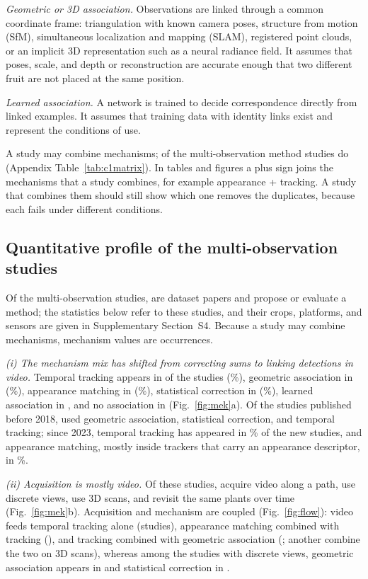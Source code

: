\textit{Geometric or 3D association.} Observations are linked through a common coordinate frame: triangulation with known camera poses, structure from motion (SfM), simultaneous localization and mapping (SLAM), registered point clouds, or an implicit 3D representation such as a neural radiance field. It assumes that poses, scale, and depth or reconstruction are accurate enough that two different fruit are not placed at the same position.

\textit{Learned association.} A network is trained to decide correspondence directly from linked examples. It assumes that training data with identity links exist and represent the conditions of use.

A study may combine mechanisms; \nCombined of the \nMethod multi-observation method studies do (Appendix Table~\ref{tab:c1matrix}). In tables and figures a plus sign joins the mechanisms that a study combines, for example appearance + tracking. A study that combines them should still show which one removes the duplicates, because each fails under different conditions.

\subsection{Quantitative profile of the multi-observation studies}\label{sec:landscape}
Of the \nMulti multi-observation studies, \nMultiData are dataset papers and \nMethod propose or evaluate a method; the statistics below refer to these \nMethod studies, and their crops, platforms, and sensors are given in Supplementary Section~S4. Because a study may combine mechanisms, mechanism values are occurrences.

\textit{(i) The mechanism mix has shifted from correcting sums to linking detections in video.} Temporal tracking appears in \nTrack of the \nMethod studies (\pTrack\%), geometric association in \nGeom (\pGeom\%), appearance matching in \nApp (\pApp\%), statistical correction in \nStat (\pStat\%), learned association in \nLearn, and no association in \nNone (Fig.~\ref{fig:mek}a). Of the \nEarly studies published before 2018, \nEarlyGeom used geometric association, \nEarlyStat statistical correction, and \nEarlyTrack temporal tracking; since 2023, temporal tracking has appeared in \pTrackRecent\% of the \nRecent new studies, and appearance matching, mostly inside trackers that carry an appearance descriptor, in \pAppRecent\%.

\textit{(ii) Acquisition is mostly video.} Of these studies, \nVideo acquire video along a path, \nDiscrete use discrete views, \nScan use 3D scans, and \nRevisit revisit the same plants over time (Fig.~\ref{fig:mek}b). Acquisition and mechanism are coupled (Fig.~\ref{fig:flow}): video feeds temporal tracking alone (\nTrackOnly studies), appearance matching combined with tracking (\nAppTrack), and tracking combined with geometric association (\nTrackGeomVideo; another \nTrackGeomScan combine the two on 3D scans), whereas among the \nDiscrete studies with discrete views, geometric association appears in \nDiscreteGeom and statistical correction in \nDiscreteStat.

